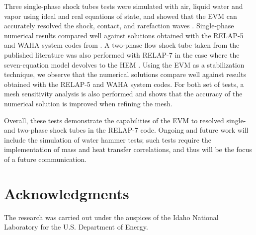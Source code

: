\documentclass{inputs/mc2015}
\begin{document}
Three single-phase shock tubes tests were simulated with air, liquid water and vapor using ideal and real equations of state, and showed that the EVM can accurately resolved the shock, contact, and rarefaction waves . Single-phase numerical results compared well against solutions obtained with the RELAP-5 and WAHA system codes from \cite{Sokolowski-Koszela}. A two-phase flow shock tube taken from the published literature was also performed with RELAP-7 in the case where the seven-equation model devolves to the HEM . Using the EVM as a stabilization technique, we observe that the numerical solutions compare well against results obtained with the RELAP-5 and WAHA system codes. For both set of tests, a mesh sensitivity analysis is also performed and shows that the accuracy of the numerical solution is improved when refining the mesh. 

Overall, these tests demonstrate the capabilities of the EVM to resolved single- and two-phase shock tubes in the RELAP-7 code. Ongoing and future work will include the simulation of water hammer tests; such tests require the implementation of mass and heat transfer correlations, and thus will be the focus of a future communication.

\section{Acknowledgments}

The research was carried out under the auspices of the Idaho National Laboratory for the U.S. Department of Energy.

\setlength{\baselineskip}{12pt}



\end{document}
